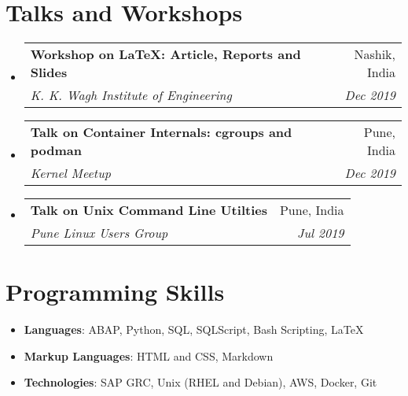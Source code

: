 \documentclass[letterpaper,11pt]{article}
\makeatletter
\newcommand{\resumeSubheading}[4]{
  \vspace{-1pt}\item
    \begin{tabular*}{0.97\textwidth}[t]{l@{\extracolsep{\fill}}r}
      \textbf{#1} & #2 \\
      \textit{\small#3} & \textit{\small #4} \\
    \end{tabular*}\vspace{-5pt}
}
\newcommand{\resumeSubHeadingListStart}{\begin{itemize}[leftmargin=*]}
\newcommand{\resumeSubHeadingListEnd}{\end{itemize}}
\makeatother
\begin{document}
\section{Talks and Workshops}
	\resumeSubHeadingListStart
	  	\resumeSubheading
	  	  {Workshop on LaTeX: Article, Reports and Slides}{Nashik, India}
		  {K. K. Wagh Institute of Engineering}{Dec 2019}
	  	\resumeSubheading
	  	  {Talk on Container Internals: cgroups and podman}{Pune, India}
		  {Kernel Meetup}{Dec 2019}
	  	\resumeSubheading
	  	  {Talk on Unix Command Line Utilties}{Pune, India}
		  {Pune Linux Users Group}{Jul 2019}
	\resumeSubHeadingListEnd

\section{Programming Skills}
	\resumeSubHeadingListStart
		\item{\textbf{Languages}{: ABAP, Python, SQL, SQLScript, Bash Scripting, LaTeX} }
			\hfill
		\item{\textbf{Markup Languages}{: HTML and CSS, Markdown} }
			\hfill
		\item{\textbf{Technologies}{: SAP GRC, Unix (RHEL and Debian), AWS, Docker, Git} }
			\hfill
	\resumeSubHeadingListEnd

\end{document}
